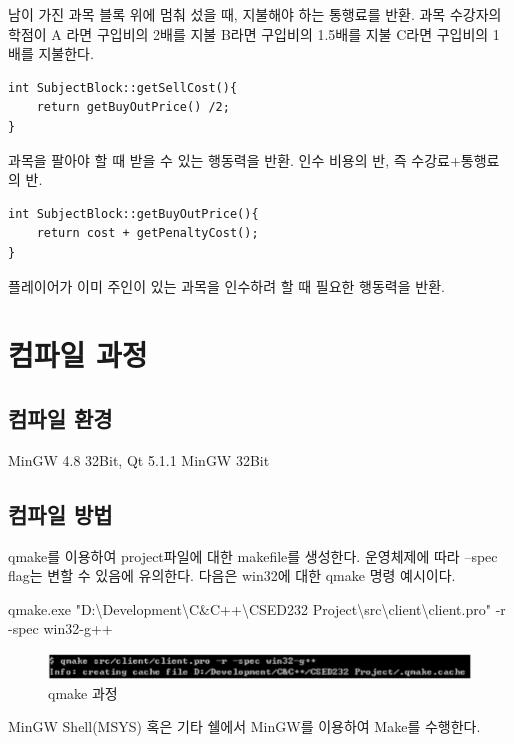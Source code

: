 \documentclass[10pt,oneside,a4paper,titlepage]{article}
\begin{document}
남이 가진 과목 블록 위에 멈춰 섰을 때, 지불해야 하는 통행료를 반환. 
과목 수강자의 학점이 A 라면 구입비의 2배를 지불
B라면 구입비의 1.5배를 지불
C라면 구입비의 1배를 지불한다.\\

\begin{lstlisting}
int SubjectBlock::getSellCost(){            
    return getBuyOutPrice() /2;
}
\end{lstlisting}
과목을 팔아야 할 때 받을 수 있는 행동력을 반환. 인수 비용의 반, 즉 수강료+통행료의 반.\\

\begin{lstlisting}
int SubjectBlock::getBuyOutPrice(){                
    return cost + getPenaltyCost();
}
\end{lstlisting}

플레이어가 이미 주인이 있는 과목을 인수하려 할 때 필요한 행동력을 반환.

\section{컴파일 과정}

\subsection{컴파일 환경}
MinGW 4.8 32Bit, Qt 5.1.1 MinGW 32Bit

\subsection{컴파일 방법}

qmake를 이용하여 project파일에 대한 makefile를 생성한다. 운영체제에 따라 –spec flag는 변할 수 있음에 유의한다. 다음은 win32에 대한 qmake 명령 예시이다.

qmake.exe "D:\textbackslash Development\textbackslash C\&C++\textbackslash CSED232 Project\textbackslash src\textbackslash client\textbackslash client.pro" -r -spec win32-g++


\begin{figure}[htbp]
\centering
\includegraphics[scale=0.8]{images/compile1}
\caption{qmake 과정}
\end{figure}

MinGW Shell(MSYS) 혹은 기타 쉘에서 MinGW를 이용하여 Make를 수행한다.
\end{document}
